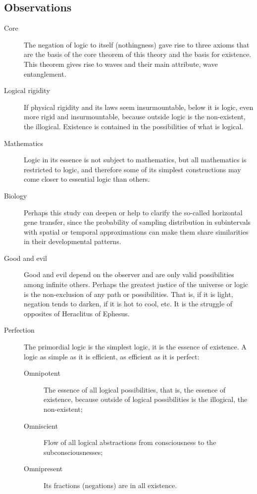 \subsection{Observations}
	\begin{description}
	   \item[Core] The negation of logic to itself (nothingness) gave rise to three axioms that are the basis of the core theorem of this theory and the basis for existence. This theorem gives rise to waves and their main attribute, wave entanglement.
	   \item[Logical rigidity] If physical rigidity and its laws seem insurmountable, below it is logic, even more rigid and insurmountable, because outside logic is the non-existent, the illogical. Existence is contained in the possibilities of what is logical. 
	   \item[Mathematics] Logic in its essence is not subject to mathematics, but all mathematics is restricted to logic, and therefore some of its simplest constructions may come closer to essential logic than others.
	   \item[Biology] Perhaps this study can deepen or help to clarify the so-called horizontal gene transfer, since the probability of sampling distribution in subintervals with spatial or temporal approximations can make them share similarities in their developmental patterns.
	   \item[Good and evil] Good and evil depend on the observer and are only valid possibilities among infinite others. Perhaps the greatest justice of the universe or logic is the non-exclusion of any path or possibilities. That is, if it is light, negation tends to darken, if it is hot to cool, etc. It is the struggle of opposites of Heraclitus of Ephesus. 
	   \item[Perfection] The primordial logic is the simplest logic, it is the essence of existence. A logic as simple as it is efficient, as efficient as it is perfect:
	   \begin{description}
		   \item[Omnipotent] The essence of all logical possibilities, that is, the essence of existence, because outside of logical possibilities is the illogical, the non-existent;
		   \item[Omniscient] Flow of all logical abstractions from consciousness to the subconsciousnesses; 
		   \item[Omnipresent] Its fractions (negations) are in all existence.

\end{description}
\end{description}
